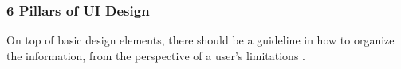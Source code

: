 \documentclass[conference]{IEEEtran}
\begin{document}


\subsubsection{6 Pillars of UI Design}
On top of basic design elements, there should be a guideline in how to organize the information, from the perspective of a user's limitations \cite{Sommerville1996}.
\end{document}
